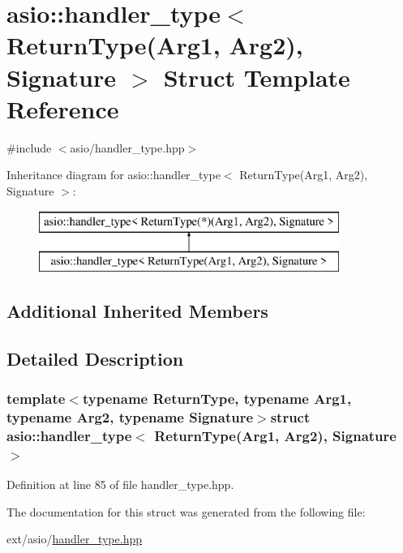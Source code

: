 \hypertarget{structasio_1_1handler__type_3_01_return_type_07_arg1_00_01_arg2_08_00_01_signature_01_4}{}\section{asio\+:\+:handler\+\_\+type$<$ Return\+Type(Arg1, Arg2), Signature $>$ Struct Template Reference}
\label{structasio_1_1handler__type_3_01_return_type_07_arg1_00_01_arg2_08_00_01_signature_01_4}


{\ttfamily \#include $<$asio/handler\+\_\+type.\+hpp$>$}

Inheritance diagram for asio\+:\+:handler\+\_\+type$<$ Return\+Type(Arg1, Arg2), Signature $>$\+:\begin{figure}[H]
\begin{center}
\leavevmode
\includegraphics[height=2.000000cm]{structasio_1_1handler__type_3_01_return_type_07_arg1_00_01_arg2_08_00_01_signature_01_4}
\end{center}
\end{figure}
\subsection*{Additional Inherited Members}


\subsection{Detailed Description}
\subsubsection*{template$<$typename Return\+Type, typename Arg1, typename Arg2, typename Signature$>$struct asio\+::handler\+\_\+type$<$ Return\+Type(\+Arg1, Arg2), Signature $>$}



Definition at line 85 of file handler\+\_\+type.\+hpp.



The documentation for this struct was generated from the following file\+:\begin{DoxyCompactItemize}
\item 
ext/asio/\hyperlink{handler__type_8hpp}{handler\+\_\+type.\+hpp}\end{DoxyCompactItemize}
